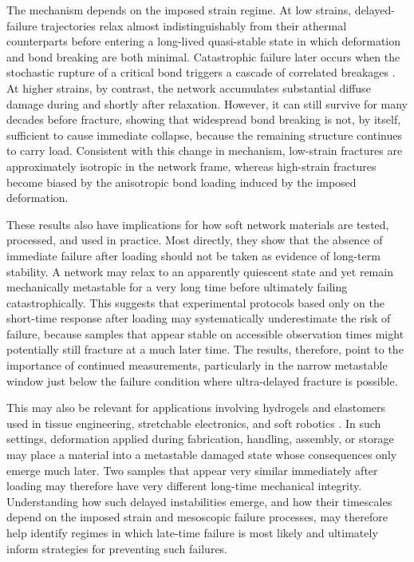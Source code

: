 The mechanism depends on the imposed strain regime. At low strains, delayed-failure trajectories relax almost indistinguishably from their athermal counterparts before entering a long-lived quasi-stable state in which deformation and bond breaking are both minimal. Catastrophic failure later occurs when the stochastic rupture of a critical bond triggers a cascade of correlated breakages \cite{mattsson_time-dependent_2017,cipelletti_microscopic_2020,aime_microscopic_2018}. At higher strains, by contrast, the network accumulates substantial diffuse damage during and shortly after relaxation. However, it can still survive for many decades before fracture, showing that widespread bond breaking is not, by itself, sufficient to cause immediate collapse, because the remaining structure continues to carry load. Consistent with this change in mechanism, low-strain fractures are approximately isotropic in the network frame, whereas high-strain fractures become biased by the anisotropic bond loading induced by the imposed deformation.

These results also have implications for how soft network materials are tested, processed, and used in practice. Most directly, they show that the absence of immediate failure after loading should not be taken as evidence of long-term stability. A network may relax to an apparently quiescent state and yet remain mechanically metastable for a very long time before ultimately failing catastrophically. This suggests that experimental protocols based only on the short-time response after loading may systematically underestimate the risk of failure, because samples that appear stable on accessible observation times might potentially still fracture at a much later time. The results, therefore, point to the importance of continued measurements, particularly in the narrow metastable window just below the failure condition where ultra-delayed fracture is possible.

This may also be relevant for applications involving hydrogels and elastomers used in tissue engineering, stretchable electronics, and soft robotics \cite{leeHydrogelsTissueEngineering2001,rogers_materials_2010,martinezSoftActuatorsRobots2014}. In such settings, deformation applied during fabrication, handling, assembly, or storage may place a material into a metastable damaged state whose consequences only emerge much later. Two samples that appear very similar immediately after loading may therefore have very different long-time mechanical integrity. Understanding how such delayed instabilities emerge, and how their timescales depend on the imposed strain and mesoscopic failure processes, may therefore help identify regimes in which late-time failure is most likely and ultimately inform strategies for preventing such failures.

